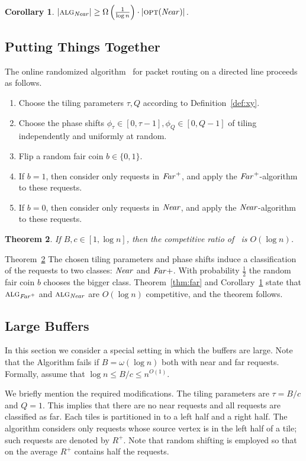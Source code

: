 \documentclass[11pt]{article}
\newtheorem{theorem}{Theorem}
\newtheorem{coro}[theorem]{Corollary}
\newcommand{\opt}{\text{\textsc{opt}}}
\newcommand{\alg}{\text{\sc{alg}}}
\newenvironment{proof sketch}[1]{\noindent {\emph{Proof sketch of #1:}}}{\hfill \qed}
\newcommand{\far}{\text{\emph{Far}}}
\newcommand{\near}{\text{\emph{Near}}}
\newcommand{\algf}{\alg_{\far^+}}
\newcommand{\algn}{\alg_{\near}}
\newcommand{\hl}{\tau}
\newcommand{\vl}{Q}
\begin{document}
\begin{coro}\label{coro:near}
$|\algn| \geq \Omega\left( \frac{1}{\log n}\right)\cdot |\opt (\near)|$.
\end{coro}
\subsection{Putting Things Together}\label{sec:together}
The online randomized algorithm \alg\ for packet routing on a directed
line proceeds as follows.
\begin{enumerate}
\item Choose the tiling parameters $\hl,\vl$ according to Definition~\ref{def:xy}.
\item Choose the phase shifts $\phi_{\hl}\in[0,\hl-1],\phi_{\vl}\in[0,\vl-1]$ of
  tiling independently and uniformly at random.
\item Flip a random fair coin $b\in \{0,1\}$.
\item If $b=1$, then consider only requests in $\far^+$, and apply the
  $\far^+$-algorithm to these requests.
\item If $b=0$, then consider only requests in $\near$, and apply the
  $\near$-algorithm to these requests.
\end{enumerate}

\begin{theorem}\label{thm:algrand}
  If $B,c \in [1,\log n]$, then the competitive ratio of \alg\ is $O(\log n)$.
\end{theorem}
\begin{proof sketch}{Theorem~\ref{thm:algrand}}
    The chosen tiling parameters and phase shifts induce a classification of the requests to two classes: $\near$ and $\far+$.
    With probability $\frac 12$ the random fair coin $b$ chooses the bigger class.
    Theorem~\ref{thm:far} and Corollary~\ref{coro:near} state that $\algf$ and $\algn$ are $O(\log n)$ competitive, and the theorem follows.
\end{proof sketch}

\subsection{Large Buffers} \label{sec:largeB}

In this section we consider a special setting in which the buffers are large.
Note that the Algorithm fails if $B=\omega(\log n)$ both with near and far requests.
Formally, assume that $\log n \leq B/c \leq n^{O(1)}$.

We briefly mention the required modifications.  The tiling parameters are $\hl=B/c$
and $\vl=1$.  This implies that there are no near requests and all requests are
classified as far.  Each tiles is partitioned in to a left half and a right half.
The algorithm considers only requests whose source vertex is in the left half of a
tile; such requests are denoted by $R^+$. Note that random shifting is employed so
that on the average $R^+$ contains half the requests.
\end{document}

